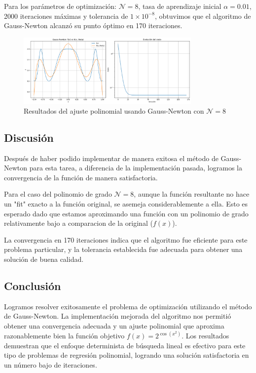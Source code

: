 \documentclass{article}
\begin{document}
Para los parámetros de optimización: $\mathcal{N}=8$, tasa de aprendizaje inicial $\alpha = 0.01$, 2000 iteraciones máximas y tolerancia de $1 \times 10^{-8}$, obtuvimos que el algoritmo de Gauss-Newton alcanzó su punto óptimo en 170 iteraciones.

\begin{figure}[H]
    \centering
    \includegraphics[width=0.8\textwidth]{images/1_gauss_newton_N8.png}
    \caption{Resultados del ajuste polinomial usando Gauss-Newton con $\mathcal{N}=8$}
    \label{fig:gauss_newton_results}
\end{figure}

\subsection{Discusión}

Después de haber podido implementar de manera exitosa el método de Gauss-Newton para esta tarea, a diferencia de la implementación pasada, logramos la convergencia de la función de manera satisfactoria. 

Para el caso del polinomio de grado $\mathcal{N}=8$, aunque la función resultante no hace un "fit" exacto a la función original, se asemeja considerablemente a ella. Esto es esperado dado que estamos aproximando una función con un polinomio de grado relativamente bajo a comparacion de la original ($f(x)$).

La convergencia en 170 iteraciones indica que el algoritmo fue eficiente para este problema particular, y la tolerancia establecida fue adecuada para obtener una solución de buena calidad.

\subsection{Conclusión}

Logramos resolver exitosamente el problema de optimización utilizando el método de Gauss-Newton. La implementación mejorada del algoritmo nos permitió obtener una convergencia adecuada y un ajuste polinomial que aproxima razonablemente bien la función objetivo $f(x) = 2^{\cos(x^2)}$. Los resultados demuestran que el enfoque determinista de búsqueda lineal es efectivo para este tipo de problemas de regresión polinomial, logrando una solución satisfactoria en un número bajo de iteraciones.
\end{document}
